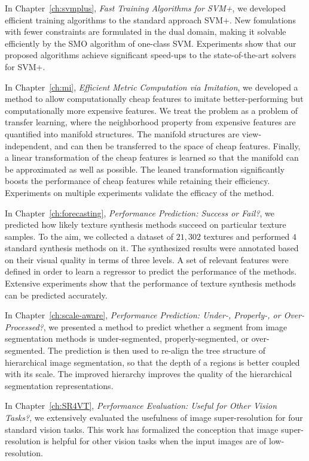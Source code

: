 In Chapter~\ref{ch:svmplus}, \emph{Fast Training Algorithms for SVM+}, we developed  efficient training algorithms to the standard approach SVM+.  New fomulations with fewer constraints are formulated in the dual domain, making it solvable efficiently by the SMO algorithm of one-class SVM.  Experiments show that our proposed algorithms achieve significant speed-ups to  the state-of-the-art solvers for  SVM+.
  
In Chapter~\ref{ch:mi}, \emph{Efficient Metric Computation via Imitation}, we developed a method to allow computationally cheap features to imitate better-performing but computationally more expensive features. We treat the problem as a  problem of transfer learning, where the neighborhood property from expensive features are quantified into manifold structures. The manifold structures are view-independent, and can then be transferred to the space of cheap features. Finally, a linear transformation of the cheap features is learned so that the manifold can be approximated as well as possible.  The leaned transformation significantly boosts the performance of cheap features while retaining their efficiency.  Experiments on multiple experiments validate the efficacy of the method. 
  
In Chapter~\ref{ch:forecasting}, \emph{Performance Prediction: Success or Fail?}, we predicted how likely texture synthesis methods succeed on particular texture samples. To the aim, we collected a dataset of $21, 302$ textures and performed $4$ standard synthesis methods on it. The synthesized results were annotated based on their visual quality in terms of three levels. A set of relevant features were defined in order to learn a regressor to predict the performance of the methods. Extensive experiments show that the performance of texture synthesis methods can be predicted accurately.  

In Chapter~\ref{ch:scale-aware}, \emph{Performance Prediction: Under-, Properly-, or Over-Processed?}, we presented a method to predict whether a segment from image segmentation methods is under-segmented, properly-segmented, or over-segmented.  The prediction is then used to re-align the tree structure of hierarchical image segmentation, so that the depth of a regions is better coupled with its scale.  The improved hierarchy improves the quality of the hierarchical segmentation representations.


In Chapter~\ref{ch:SR4VT}, \emph{Performance Evaluation: Useful for Other Vision Tasks?}, we extensively evaluated the usefulness of image super-resolution for four standard vision tasks. This work has formalized the conception that image super-resolution is helpful for other vision tasks when the input images are of low-resolution.  


